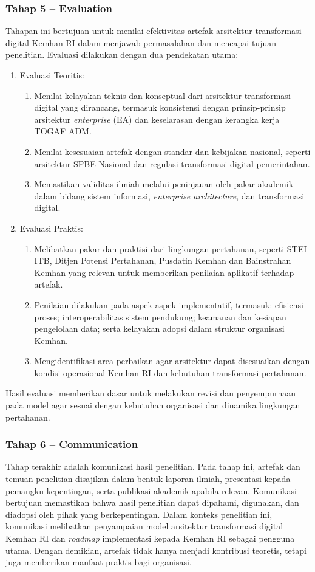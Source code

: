\subsubsection{Tahap 5 – Evaluation}
Tahapan ini bertujuan untuk menilai efektivitas artefak arsitektur transformasi digital Kemhan RI dalam menjawab permasalahan dan mencapai tujuan penelitian. Evaluasi dilakukan dengan dua pendekatan utama:
\begin{enumerate}
  \item Evaluasi Teoritis:
  \begin{enumerate}
    \item Menilai kelayakan teknis dan konseptual dari arsitektur transformasi digital yang dirancang, termasuk konsistensi dengan prinsip-prinsip arsitektur \textit{enterprise} (EA) dan keselarasan dengan kerangka kerja TOGAF ADM.
    \item Menilai kesesuaian artefak dengan standar dan kebijakan nasional, seperti arsitektur SPBE Nasional dan regulasi transformasi digital pemerintahan.
    \item Memastikan validitas ilmiah melalui peninjauan oleh pakar akademik dalam bidang sistem informasi, \textit{enterprise architecture}, dan transformasi digital.
  \end{enumerate}
  \item Evaluasi Praktis:
  \begin{enumerate}
    \item Melibatkan pakar dan praktisi dari lingkungan pertahanan, seperti STEI ITB, Ditjen Potensi Pertahanan, Pusdatin Kemhan dan Bainstrahan Kemhan yang relevan untuk memberikan penilaian aplikatif terhadap artefak.
    \item Penilaian dilakukan pada aspek-aspek implementatif, termasuk: efisiensi proses; interoperabilitas sistem pendukung; keamanan dan kesiapan pengelolaan data; serta kelayakan adopsi dalam struktur organisasi Kemhan.
    \item Mengidentifikasi area perbaikan agar arsitektur dapat disesuaikan dengan kondisi operasional Kemhan RI dan kebutuhan transformasi pertahanan.
  \end{enumerate}
\end{enumerate}
Hasil evaluasi memberikan dasar untuk melakukan revisi dan penyempurnaan pada model agar sesuai dengan kebutuhan organisasi dan dinamika lingkungan pertahanan.

\subsubsection{Tahap 6 – Communication}
Tahap terakhir adalah komunikasi hasil penelitian. Pada tahap ini, artefak dan temuan penelitian disajikan dalam bentuk laporan ilmiah, presentasi kepada pemangku kepentingan, serta publikasi akademik apabila relevan.
Komunikasi bertujuan memastikan bahwa hasil penelitian dapat dipahami, digunakan, dan diadopsi oleh pihak yang berkepentingan.
Dalam konteks penelitian ini, komunikasi melibatkan penyampaian model arsitektur transformasi digital Kemhan RI dan \textit{roadmap} implementasi kepada Kemhan RI sebagai pengguna utama.
Dengan demikian, artefak tidak hanya menjadi kontribusi teoretis, tetapi juga memberikan manfaat praktis bagi organisasi.

